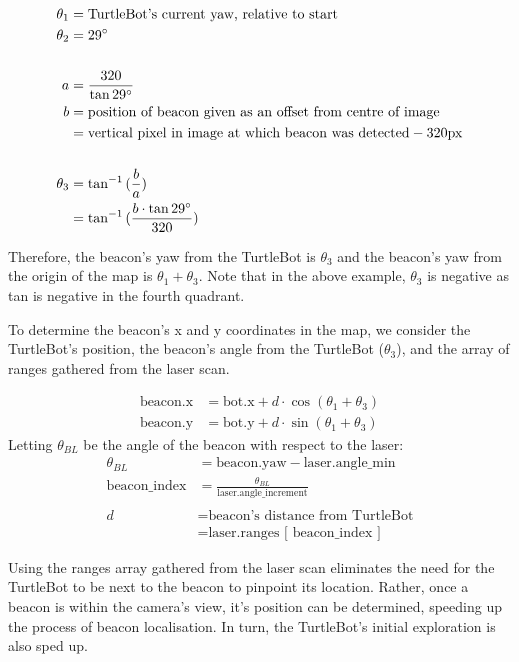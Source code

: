 \documentclass[titlepage,12pt,a4paper]{article}
\begin{document}
\begin{align*}
	\theta_1   &=  \text{TurtleBot's current yaw, relative to start} \\
	\theta_2   &=  29\degree \\
	\\
	a 	        &=  \frac{320}{\tan{29\degree}} \\ 
	b 	        &=  \text{position of beacon given as an offset from centre of image} \\
			&=  \text{vertical pixel in image at which beacon was detected} - 320\text{px} \\
	\\
	\theta_3   &= \tan^{-1}{(\frac{b}{a})} \\
		        &= \tan^{-1}{(\frac{b \cdot \tan{29\degree}}{320})} 
\end{align*}

Therefore, the beacon's yaw from the TurtleBot is $\theta_3$ and the beacon's yaw from the origin of the map is $\theta_1 + \theta_3$. Note that in the above example, $\theta_3$ is negative as tan is negative in the fourth quadrant.

To determine the beacon's x and y coordinates in the map, we consider the TurtleBot's position, the beacon's angle from the TurtleBot ($\theta_3$), and the array of ranges gathered from the laser scan. 

\begin{align*}
	\text{beacon.x}		&=		\text{bot.x} + d \cdot \cos{(\theta_1 + \theta_3)} \\
	\text{beacon.y} 		&= 		\text{bot.y} + d \cdot \sin{(\theta_1 + \theta_3)} 
\end{align*}
Letting $\theta_{BL}$ be the angle of the beacon with respect to the laser: 
\begin{align*}
		\theta_{BL}	&= 		\text{beacon.yaw} - \text{laser.angle\_min} \\
   \text{beacon\_index}	&=		\frac{\theta_{BL}}{\text{laser.angle\_increment}} \\
   					 \\
				d 	&=		\text{beacon's distance from TurtleBot} \\
					&=		\text{laser.ranges [ beacon\_index ]} 
\end{align*}

Using the ranges array gathered from the laser scan eliminates the need for the TurtleBot to be next to the beacon to pinpoint its location. Rather, once a beacon is within the camera's view, it's position can be determined, speeding up the process of beacon localisation. In turn, the TurtleBot's initial exploration is also sped up.
\end{document}
